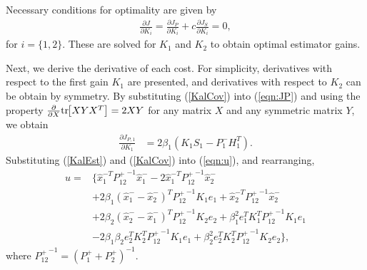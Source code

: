 \documentclass[letterpaper, 10pt, conference]{ieeeconf}
\newcommand{\bracket}[1]{\ensuremath{\left[ #1 \right]}}
\newcommand{\refeqn}[1]{(\ref{eqn:#1})}
\newcommand{\tr}[1]{\mathrm{tr}\ensuremath{\negthickspace\bracket{#1}}}
\newcommand{\deriv}[2]{\ensuremath{\frac{\partial #1}{\partial #2}}}
\newcommand{\EditTL}[1]{{\color{red}\protect #1}}
\begin{document}
Necessary conditions for optimality are given by
\begin{align}
\deriv{J}{K_i} = \deriv{J_P}{K_i} + c \deriv{J_S}{K_i} =0,\label{eqn:NCO}
\end{align}
for $i=\{1,2\}$. These are solved for $K_1$ and $K_2$ to obtain optimal estimator gains. 





Next, we derive the derivative of each cost. For simplicity, derivatives with respect to the first gain $K_1$ are presented, and derivatives with respect to $K_2$ can be obtain by symmetry. By substituting (\ref{KalCov}) into \refeqn{JP} and using the property $\frac{\partial}{\partial X}\tr{XYX^T}=2XY$ for any matrix $X$ and any symmetric matrix $Y$, we obtain
\begin{align}
\label{CostP}
\frac{\partial J_{P,1}}{\partial K_{1}}&=2\beta_1({K_1S_1-P_1^-H_1^T}).
\end{align}
%
Substituting (\ref{KalEst}) and (\ref{KalCov}) into \refeqn{u}, and rearranging, 
\begin{align}
u%
=&\{\hat x_1^{-T}{P^+_{12}}^{-1}\hat x_1^-
-2\hat x_1^{-T}{P^+_{12}}^{-1}\hat x_2^-\nonumber\\
&+2\beta_1(\hat x_1^{-}-\hat x_2^{-})^T{P^+_{12}}^{-1}K_1e_1
+\hat x_2^{-T}{P^+_{12}}^{-1}\hat x_2^-\nonumber\\
&+2\beta_2(\hat x_2^{-}-\hat x_1^{-})^T{P^+_{12}}^{-1}K_2e_2
+\beta_1^2e_1^TK_1^T{P^+_{12}}^{-1}K_1e_1\nonumber\\
&-2\beta_1\beta_2e_2^TK_2^T{P^+_{12}}^{-1}K_1e_1+\beta_2^2e_2^TK_2^T{P^+_{12}}^{-1}K_2e_2\},
\end{align}
where ${P^+_{12}}^{-1}=(P_1^++P_2^+)^{-1}$. 
\end{document}

